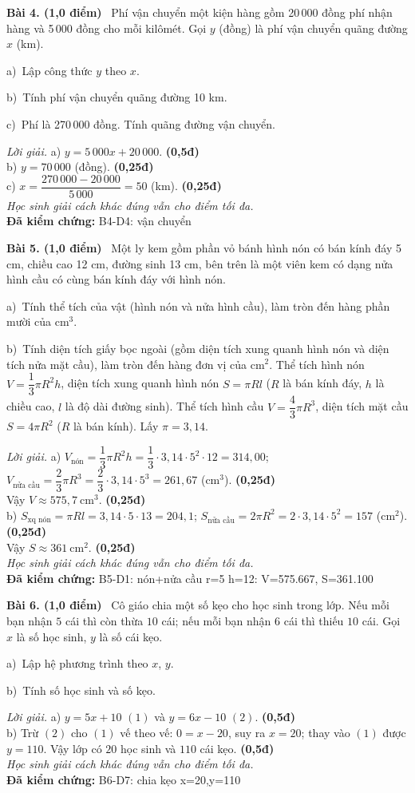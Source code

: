 \documentclass[12pt,a4paper]{article}
\newif\ifloigiai \loigiaitrue   %
\newenvironment{bai}[4]{\par\medskip\noindent\textbf{Bài #1. (#2 điểm)}\ }{\par}
\newcommand{\y}[2]{\par\hspace*{1em}#1)~#2}             %
\newcommand{\loigiai}[1]{\ifloigiai\par\smallskip\noindent\textit{Lời giải.} #1\par\fi}
\newcommand{\diem}[1]{\ifloigiai\hfill\textbf{(#1đ)}\fi}  %
\begin{document}
\begin{bai}{4}{1,0}{B4-D4}{TS10-D42-B4}
Phí vận chuyển một kiện hàng gồm 20\,000 đồng phí nhận hàng và 5\,000 đồng cho mỗi kilômét. Gọi $y$ (đồng) là phí vận chuyển quãng đường $x$ (km).
\y{a}{Lập công thức $y$ theo $x$.}
\y{b}{Tính phí vận chuyển quãng đường 10 km.}
\y{c}{Phí là 270\,000 đồng. Tính quãng đường vận chuyển.}
\loigiai{
a) $y=5\,000x+20\,000$. \diem{0,5}\\
b) $y=70\,000$ (đồng). \diem{0,25}\\
c) $x=\dfrac{270\,000-20\,000}{5\,000}=50$ (km). \diem{0,25}
\\\textit{Học sinh giải cách khác đúng vẫn cho điểm tối đa.}\\
\textbf{Đã kiểm chứng:} B4-D4: vận chuyển
}
\end{bai}

\begin{bai}{5}{1,0}{B5-D1}{TS10-D42-B5}
Một ly kem gồm phần vỏ bánh hình nón có bán kính đáy 5 cm, chiều cao 12 cm, đường sinh 13 cm, bên trên là một viên kem có dạng nửa hình cầu có cùng bán kính đáy với hình nón.
\y{a}{Tính thể tích của vật (hình nón và nửa hình cầu), làm tròn đến hàng phần mười của $\text{cm}^3$.}
\y{b}{Tính diện tích giấy bọc ngoài (gồm diện tích xung quanh hình nón và diện tích nửa mặt cầu), làm tròn đến hàng đơn vị của $\text{cm}^2$.}
Thể tích hình nón $V=\dfrac13\pi R^2h$, diện tích xung quanh hình nón $S=\pi Rl$ ($R$ là bán kính đáy, $h$ là chiều cao, $l$ là độ dài đường sinh). Thể tích hình cầu $V=\dfrac43\pi R^3$, diện tích mặt cầu $S=4\pi R^2$ ($R$ là bán kính). Lấy $\pi=3{,}14$.
\loigiai{
a) $V_{\text{nón}}=\dfrac13\pi R^2h=\dfrac13\cdot3{,}14\cdot5^2\cdot12=314{,}00$; $V_{\text{nửa cầu}}=\dfrac23\pi R^3=\dfrac23\cdot3{,}14\cdot5^3=261{,}67$ ($\text{cm}^3$). \diem{0,25}\\
Vậy $V\approx575{,}7\ \text{cm}^3$. \diem{0,25}\\[2pt]
b) $S_{\text{xq nón}}=\pi Rl=3{,}14\cdot5\cdot13=204{,}1$; $S_{\text{nửa cầu}}=2\pi R^2=2\cdot3{,}14\cdot5^2=157$ ($\text{cm}^2$). \diem{0,25}\\
Vậy $S\approx361\ \text{cm}^2$. \diem{0,25}
\\\textit{Học sinh giải cách khác đúng vẫn cho điểm tối đa.}\\
\textbf{Đã kiểm chứng:} B5-D1: nón+nửa cầu r=5 h=12: V=575.667, S=361.100
}
\end{bai}

\begin{bai}{6}{1,0}{B6-D7}{TS10-D42-B6}
Cô giáo chia một số kẹo cho học sinh trong lớp. Nếu mỗi bạn nhận $5$ cái thì còn thừa $10$ cái; nếu mỗi bạn nhận $6$ cái thì thiếu $10$ cái. Gọi $x$ là số học sinh, $y$ là số cái kẹo.
\y{a}{Lập hệ phương trình theo $x$, $y$.}
\y{b}{Tính số học sinh và số kẹo.}
\loigiai{
a) $y=5x+10$ $(1)$ và $y=6x-10$ $(2)$. \diem{0,5}\\
b) Trừ $(2)$ cho $(1)$ vế theo vế: $0=x-20$, suy ra $x=20$; thay vào $(1)$ được $y=110$. Vậy lớp có $20$ học sinh và $110$ cái kẹo. \diem{0,5}
\\\textit{Học sinh giải cách khác đúng vẫn cho điểm tối đa.}\\
\textbf{Đã kiểm chứng:} B6-D7: chia kẹo x=20,y=110
}
\end{bai}
\end{document}
